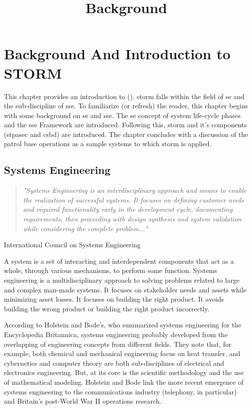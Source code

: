 \documentclass[../../main/main.tex]{subfiles}
\begin{document}
\title{Background}


\chapter{Background And Introduction to STORM}\label{chp:storm}
This chapter provides an introduction to  ().  \gls{storm} falls within the field of \gls{se} and the sub-discipline of \gls{sse}. To familiarize (or refresh) the reader, this chapter begins with some background on \gls{se} and \gls{sse}.  The \gls{se} concept of system life-cycle phases and the \gls{sse} Framework are introduced.  Following this, \gls{storm} and it's components (\gls{stpasec} and \gls{csbd}) are introduced.  The chapter concludes with a discussion of the patrol base operations as a sample systems to which  \gls{storm} is applied.

\section{Systems Engineering}\label{sec:stormse}
\begin{quote}
\textit{"Systems Engineering is an interdisciplinary approach and means to enable the realization of successful systems. It focuses on defining customer needs and required functionality early in the development cycle, documenting requirements, then proceeding with design synthesis and system validation while considering the complete problem..."
}\end{quote}
\begin{flushright} International Council on Systems Engineering \end{flushright} 

A system is a set of interacting and interdependent components that act as a whole,  through various mechanisms, to perform some function. Systems engineering is a multidisciplinary approach to solving problems related to large and complex man-made systems.  It focuses on stakeholder needs and assets while minimizing asset losses.  It focuses on building the right product.  It avoids building the wrong product or building the right product incorrectly.  

According to Holstein and Bode's, who summarized systems engineering for the Encyclopedia Britannica, systems engineering probably developed from the overlapping of engineering concepts from different fields. They note that, for example, both chemical and mechanical engineering focus on heat transfer, and cybernetics and computer theory are both sub-disciplines of electrical and electronics engineering.   But, at its core is the scientific methodology and the use of mathematical modeling.  Holstein and Bode link the more recent emergence of systems engineering to the communications industry (telephony, in particular) and Britain's post-World War II operations research.
\end{document}
